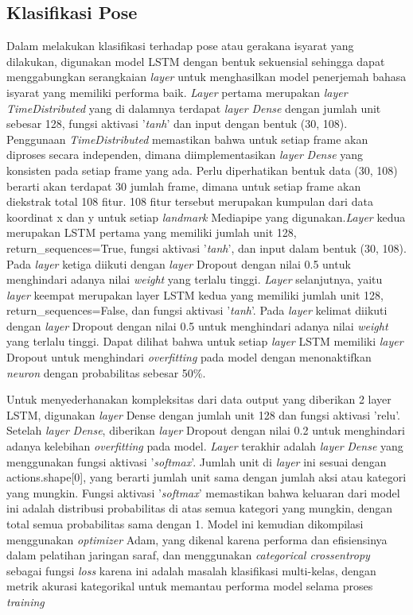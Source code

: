 \subsection{Klasifikasi Pose}
\label{sec:metodologipose}

Dalam melakukan klasifikasi terhadap pose atau gerakana isyarat yang dilakukan, digunakan model LSTM dengan bentuk sekuensial sehingga dapat menggabungkan serangkaian \emph{layer} untuk menghasilkan model penerjemah bahasa isyarat yang memiliki performa baik. \emph{Layer} pertama merupakan \emph{layer} \textit{TimeDistributed} yang di dalamnya terdapat \emph{layer} \textit{Dense} dengan jumlah unit sebesar 128, fungsi aktivasi '\textit{tanh}' dan input dengan bentuk (30, 108). Penggunaan \textit{TimeDistributed} memastikan bahwa untuk setiap frame akan diproses secara independen, dimana diimplementasikan \emph{layer} \textit{Dense} yang konsisten pada setiap frame yang ada. Perlu diperhatikan bentuk data (30, 108) berarti akan terdapat 30 jumlah frame, dimana untuk setiap frame akan diekstrak total 108 fitur. 108 fitur tersebut merupakan kumpulan dari data koordinat x dan y untuk setiap \emph{landmark} Mediapipe yang digunakan.\emph{Layer} kedua merupakan LSTM pertama yang memiliki jumlah unit 128, return\_sequences=True, fungsi aktivasi '\textit{tanh}', dan input dalam bentuk (30, 108). Pada \emph{layer} ketiga diikuti dengan \emph{layer} Dropout dengan nilai 0.5 untuk menghindari adanya nilai \emph{weight} yang terlalu tinggi. \emph{Layer} selanjutnya, yaitu \emph{layer} keempat merupakan layer LSTM kedua yang memiliki jumlah unit 128, return\_sequences=False, dan fungsi aktivasi '\textit{tanh}'. Pada \emph{layer} kelimat diikuti dengan \emph{layer} Dropout dengan nilai 0.5 untuk menghindari adanya nilai \emph{weight} yang terlalu tinggi. Dapat dilihat bahwa untuk setiap \emph{layer} LSTM memiliki \emph{layer} Dropout untuk menghindari \emph{overfitting} pada model dengan menonaktifkan \emph{neuron} dengan probabilitas sebesar 50\%. 

Untuk menyederhanakan kompleksitas dari data output yang diberikan 2 layer LSTM, digunakan \emph{layer} Dense dengan jumlah unit 128 dan fungsi aktivasi 'relu'. Setelah \emph{layer} \textit{Dense}, diberikan \emph{layer} Dropout dengan nilai 0.2 untuk menghindari adanya kelebihan \emph{overfitting} pada model. \emph{Layer} terakhir adalah \emph{layer} \textit{Dense} yang menggunakan fungsi aktivasi '\textit{softmax}'. Jumlah unit di \emph{layer} ini sesuai dengan actions.shape[0], yang berarti jumlah unit sama dengan jumlah aksi atau kategori yang mungkin. Fungsi aktivasi '\textit{softmax}' memastikan bahwa keluaran dari model ini adalah distribusi probabilitas di atas semua kategori yang mungkin, dengan total semua probabilitas sama dengan 1. Model ini kemudian dikompilasi menggunakan \emph{optimizer} Adam, yang dikenal karena performa dan efisiensinya dalam pelatihan jaringan saraf, dan menggunakan \textit{categorical crossentropy} sebagai fungsi \textit{loss} karena ini adalah masalah klasifikasi multi-kelas, dengan metrik akurasi kategorikal untuk memantau performa model selama proses \textit{training} 

